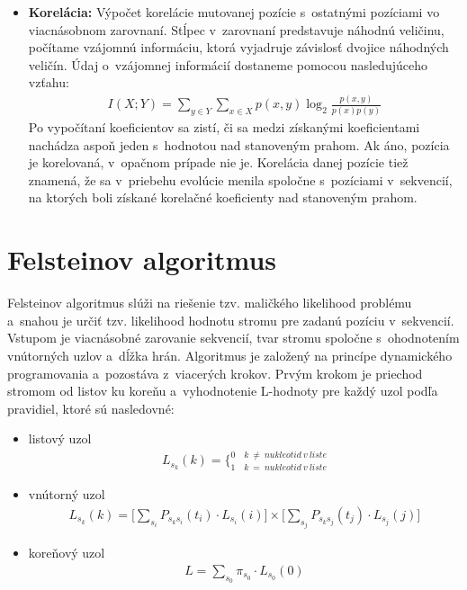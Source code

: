 \begin{itemize}
	\item \textbf{Korelácia:} Výpočet korelácie mutovanej pozície s~ostatnými pozíciami vo viacnásobnom zarovnaní. Stĺpec v~zarovnaní predstavuje náhodnú veličinu, počítame vzájomnú informáciu, ktorá vyjadruje závislosť dvojice náhodných veličín. Údaj o~vzájomnej informácií dostaneme pomocou nasledujúceho vzťahu: 	
	\begin{align}
	I(X;Y) = \underset{y \in Y}{\sum} \underset{x \in X}{\sum} p(x,y) \log_{2}\frac{p(x,y)}{p(x) p(y)}
	\end{align}  
	Po vypočítaní koeficientov sa zistí, či sa medzi získanými koeficientami nachádza aspoň jeden s~hodnotou nad stanoveným prahom. Ak áno, pozícia je korelovaná, v~opačnom prípade nie je. Korelácia danej pozície tiež znamená, že sa v~priebehu evolúcie menila spoločne s~pozíciami v~sekvencií, na ktorých boli získané korelačné koeficienty nad stanoveným prahom. 
	
\end{itemize}

\section{Felsteinov algoritmus}
\label{felstein}
Felsteinov algoritmus slúži na riešenie tzv. maličkého likelihood problému a~snahou je určiť tzv. likelihood hodnotu stromu pre zadanú pozíciu v~sekvencií. Vstupom je viacnásobné zarovanie sekvencií, tvar stromu spoločne s~ohodnotením vnútorných uzlov a~dĺžka hrán. 
Algoritmus je založený na princípe dynamického programovania a~pozostáva z~viacerých krokov.
Prvým krokom je priechod stromom od listov ku koreňu a~vyhodnotenie L-hodnoty pre každý uzol podľa pravidiel, ktoré sú nasledovné:
\begin{itemize}
	\item listový uzol
	\begin{align}
	L_{s_{k}} (k) = \bigg\{_{1\quad k\ =\ nukleotid\ v\  liste}^{0\quad k\ \neq\ nukleotid\ v\  liste}
	\end{align}  
	
	\item vnútorný uzol
	\begin{align}
	L_{s_{k}} (k) = \Bigg[\underset{s_{i}}{\sum}P_{s_{k}s_{i}}(t_{i})\cdotp L_{s_{i}}(i)\Bigg] \times \Bigg[\underset{s_{j}}{\sum}P_{s_{k}s_{j}}(t_{j})\cdotp L_{s_{j}}(j)\Bigg]
	\end{align}
	
	\item koreňový uzol
	\begin{align}
	L = \underset{s_{0}}{\sum}\pi_{s_{0}} \cdotp L_{s_{0}}(0)
	\end{align} 

\end{itemize}

